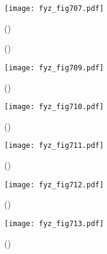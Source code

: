     \begin{figure}[ht!] %
      \centering
      \texttt{[image: fyz\_fig707.pdf]}
      \caption{
               (\cite[s.~707]{Feynman02})}
      \label{fyz:fig707}
    \end{figure}

    \begin{figure}[ht!]
      \centering
      \label{fyz:fig708}
      \caption{
               (\cite[s.~748]{Feynman02})}
    \end{figure}

    \begin{figure}[ht!] %
      \centering
      \texttt{[image: fyz\_fig709.pdf]}
      \caption{
               (\cite[s.~707]{Feynman02})}
      \label{fyz:fig709}
    \end{figure}

    \begin{figure}[ht!] %
      \centering
      \texttt{[image: fyz\_fig710.pdf]}
      \caption{
               (\cite[s.~707]{Feynman02})}
      \label{fyz:fig710}
    \end{figure}

    \begin{figure}[ht!] %
      \centering
      \texttt{[image: fyz\_fig711.pdf]}
      \caption{
               (\cite[s.~707]{Feynman02})}
      \label{fyz:fig711}
    \end{figure}

    \begin{figure}[ht!] %
      \centering
      \texttt{[image: fyz\_fig712.pdf]}
      \caption{
               (\cite[s.~707]{Feynman02})}
      \label{fyz:fig712}
    \end{figure}

    \begin{figure}[ht!] %
      \centering
      \texttt{[image: fyz\_fig713.pdf]}
      \caption{
               (\cite[s.~707]{Feynman02})}
      \label{fyz:fig713}
    \end{figure}

